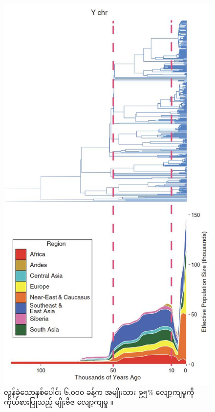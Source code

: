\documentclass[10pt,twocolumn,letterpaper]{article}
\begin{document}
\begin{figure}[b]
\begin{center}
   \includegraphics[width=1\linewidth]{bottleneck.jpg}
\end{center}
   \caption{လွန်ခဲ့သောနှစ်ပေါင်း ၆,၀၀၀ ခန့်က အမျိုးသား ၉၅\% လျော့ကျမှုကို ကိုယ်စားပြုသည့် မျိုးဗီဇ လျော့ကျမှု \cite{62}။}
\label{fig:10}
\label{fig:onecol}
\end{figure}
\end{document}
